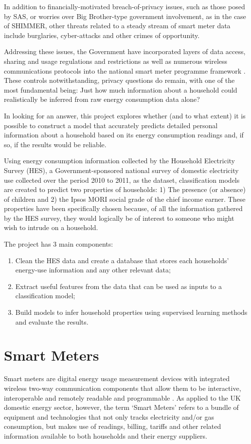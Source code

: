 In addition to financially-motivated breach-of-privacy issues, such as those posed by SAS, or worries over Big Brother-type government involvement, as in the case of SHIMMER, other threats related to a steady stream of smart meter data include burglaries, cyber-attacks and other crimes of opportunity. 

Addressing these issues, the Government have incorporated layers of data access, sharing and usage regulations and restrictions as well as numerous wireless communications protocols into the national smart meter programme framework \cite{DECC_2}.  These controls notwithstanding, privacy questions do remain, with one of the most fundamental being: Just how much information about a household could realistically be inferred from raw energy consumption data alone? 

In looking for an answer, this project explores whether (and to what extent) it is possible to construct a model that accurately predicts detailed personal information about a household based on its energy consumption readings and, if so, if the results would be reliable. 

Using energy consumption information collected by the Household Electricity Survey (HES), a Government-sponsored national survey of domestic electricity use collected over the period 2010 to 2011, as the dataset, classification models are created to predict two properties of households: 1) The presence (or absence) of children and 2) the Ipsos MORI social grade of the chief income earner. These properties have been specifically chosen because, of all the information gathered by the HES survey, they would logically be of interest to someone who might wish to intrude on a household.
\newline

The project has 3 main components:

\begin{enumerate}
\item Clean the HES data and create a database that stores each households' energy-use information and any other relevant data;
\item Extract useful features from the data that can be used as inputs to a classification model; 
\item Build models to infer household properties using supervised learning methods and evaluate the results.
\end{enumerate}


\section{Smart Meters}
Smart meters are digital energy usage measurement devices with integrated wireless two-way communication components that allow them to be interactive, interoperable and remotely readable and programmable \cite{Anderson}.  As applied to the UK domestic energy sector, however, the term `Smart Meters' refers to a bundle of equipment and technologies that not only tracks electricity and/or gas consumption, but makes use of readings, billing, tariffs and other related information available to both households and their energy suppliers\cite{DECC_4}.

